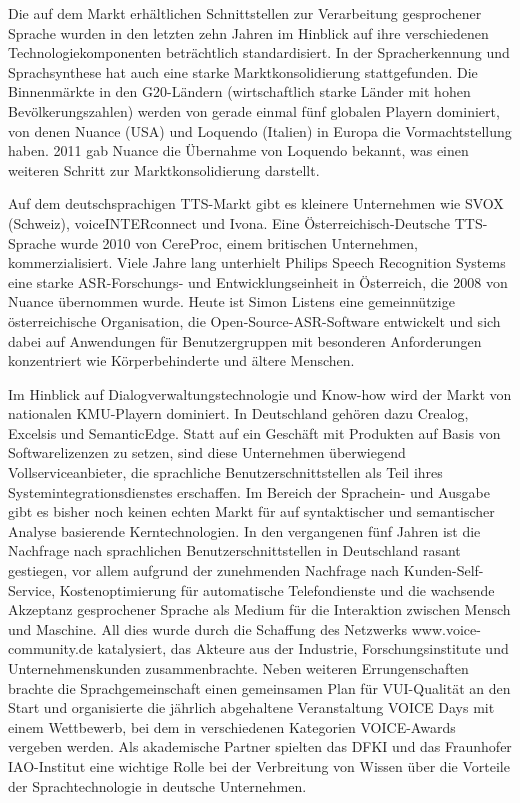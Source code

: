 \documentclass[]{../../metanetpaper}
\begin{document}
\begin{Parallel}[c]{80mm}{80mm}
{Die auf dem Markt erhältlichen Schnittstellen zur Verarbeitung gesprochener Sprache wurden in den letzten zehn Jahren im Hinblick auf ihre verschiedenen Technologiekomponenten beträchtlich standardisiert. In der Spracherkennung und Sprachsynthese hat auch eine starke Marktkonsolidierung stattgefunden. Die Binnenmärkte in den G20-Ländern (wirtschaftlich starke Länder mit hohen Bevölkerungszahlen) werden von gerade einmal fünf globalen Playern dominiert, von denen Nuance (USA) und Loquendo (Italien) in Europa die Vormachtstellung haben. 2011 gab Nuance die Übernahme von Loquendo bekannt, was einen weiteren Schritt zur Marktkonsolidierung darstellt.

Auf dem deutschsprachigen TTS-Markt gibt es kleinere Unternehmen wie SVOX (Schweiz), voiceINTERconnect und Ivona. Eine Österreichisch-Deutsche TTS-Sprache wurde 2010 von CereProc, einem britischen Unternehmen, kommerzialisiert. Viele Jahre lang unterhielt Philips Speech Recognition Systems eine starke ASR-Forschungs- und Entwicklungseinheit in Österreich, die 2008 von Nuance übernommen wurde. Heute ist Simon Listens eine gemeinnützige österreichische Organisation, die Open-Source-ASR-Software entwickelt und sich dabei auf Anwendungen für Benutzergruppen mit besonderen Anforderungen konzentriert wie Körperbehinderte und ältere Menschen.

Im Hinblick auf Dialogverwaltungstechnologie und Know-how wird der Markt von nationalen KMU-Playern dominiert. In Deutschland gehören dazu Crealog, Excelsis und SemanticEdge. Statt auf ein Geschäft mit Produkten auf Basis von Softwarelizenzen zu setzen, sind diese Unternehmen überwiegend Vollserviceanbieter, die sprachliche Benutzerschnittstellen als Teil ihres Systemintegrationsdienstes erschaffen. Im Bereich der Sprachein- und Ausgabe gibt es bisher noch keinen echten Markt für auf syntaktischer und semantischer Analyse basierende Kerntechnologien.
In den vergangenen fünf Jahren ist die Nachfrage nach sprachlichen Benutzerschnittstellen in Deutschland rasant gestiegen, vor allem aufgrund der zunehmenden Nachfrage nach Kunden-Self-Service, Kostenoptimierung für automatische Telefondienste und die wachsende Akzeptanz gesprochener Sprache als Medium für die Interaktion zwischen Mensch und Maschine. All dies wurde durch die Schaffung des Netzwerks www.voice-community.de katalysiert, das Akteure aus der Industrie, Forschungsinstitute und Unternehmenskunden zusammenbrachte. Neben weiteren Errungenschaften brachte die Sprachgemeinschaft einen gemeinsamen Plan für VUI-Qualität an den Start und organisierte die jährlich abgehaltene Veranstaltung VOICE Days mit einem Wettbewerb, bei dem in verschiedenen Kategorien VOICE-Awards vergeben werden. Als akademische Partner spielten das DFKI und das Fraunhofer IAO-Institut eine wichtige Rolle bei der Verbreitung von Wissen über die Vorteile der Sprachtechnologie in deutsche Unternehmen.

}
\end{Parallel}
\end{document}
